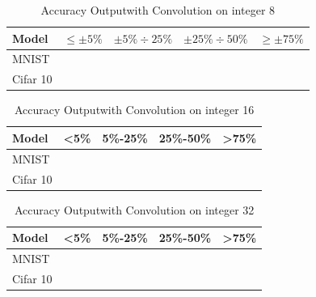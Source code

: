 \begin{center}
\begin{table}[!htbp]
\centering
\captionsetup{justification=centering}
\begin{tabular}{ |p{2.2cm}||p{2cm}|p{2cm}|p{2cm}|p{2cm}| }
\hline
Model &  $\leq\pm5\%$ &  $\pm5\%\div25\%$ & $\pm25\%\div50\%$ & $\geq\pm75\%$ \\ 
\hline
MNIST &   & & &\\ 
\hline
Cifar 10& & & & \\
\hline
\end{tabular}
\caption{Accuracy Output\protect\footnotemark[2]  with Convolution on integer 8 }
\label{table:accuracyint8}
\end{table}
\end{center}
\begin{center}
\begin{table}[!htbp]
\centering
\captionsetup{justification=centering}
\begin{tabular}{ |p{2.2cm}||p{2cm}|p{2cm}|p{2cm}|p{2cm}| }
\hline
Model &  <5\% &  5\%-25\% & 25\%-50\% & >75\% \\ 
\hline
MNIST &   & & &\\ 
\hline
Cifar 10& & & & \\
\hline
\end{tabular}
\caption{Accuracy Output\protect\footnotemark[2]  with Convolution on integer 16 }
\label{table:accuracyint16}
\end{table}
\end{center}

\begin{center}
\begin{table}[!htbp]
\centering
\captionsetup{justification=centering}
\begin{tabular}{ |p{2.2cm}||p{2cm}|p{2cm}|p{2cm}|p{2cm}| }
\hline
Model &  <5\% &  5\%-25\% & 25\%-50\% & >75\% \\ 
\hline
MNIST &   & & &\\ 
\hline
Cifar 10& & & & \\
\hline
\end{tabular}
\caption{Accuracy Output\protect\footnotemark[2]  with Convolution on integer 32 }
\label{table:accuracyint32}
\end{table}
\end{center}


